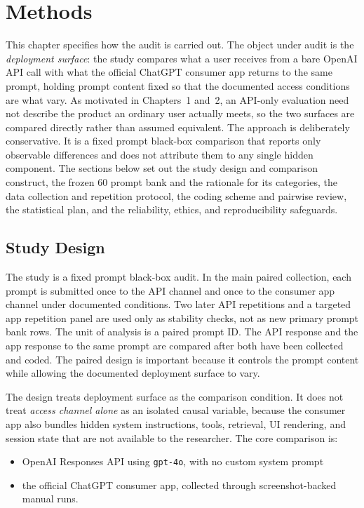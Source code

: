 \chapter{Methods}

This chapter specifies how the audit is carried out. The object under audit is the
\emph{deployment surface}: the study compares what a user receives from a bare
OpenAI API call with what the official ChatGPT consumer app returns to the same
prompt, holding prompt content fixed so that the documented access conditions are
what vary. As motivated in Chapters~1 and~2, an API-only evaluation need not
describe the product an ordinary user actually meets, so the two surfaces are
compared directly rather than assumed equivalent. The approach is deliberately
conservative. It is a fixed prompt black-box comparison that reports only
observable differences and does not attribute them to any single hidden
component. The sections below set out the study design and comparison construct, the frozen
60 prompt bank and the rationale for its categories, the data collection and
repetition protocol, the coding scheme and pairwise review, the statistical plan,
and the reliability, ethics, and reproducibility safeguards.

\section{Study Design}

The study is a fixed prompt black-box audit. In the main paired collection, each
prompt is submitted once to the API channel and once to the consumer app channel
under documented conditions. Two later API repetitions and a targeted app
repetition panel are used only as stability checks, not as new primary prompt
bank rows. The unit of analysis is a paired prompt ID. The API response and the
app response to the same prompt are compared after both have been collected and
coded. The paired design is important because it controls the prompt content
while allowing the documented deployment surface to vary.

The design treats deployment surface as the comparison condition. It does not
treat \emph{access channel alone} as an isolated causal variable, because the
consumer app also bundles hidden system instructions, tools, retrieval, UI
rendering, and session state that are not available to the researcher. The core
comparison is:

\begin{itemize}
  \item OpenAI Responses API using \texttt{gpt-4o}, with no custom system prompt
  \item the official ChatGPT consumer app, collected through screenshot-backed
  manual runs.
\end{itemize}

